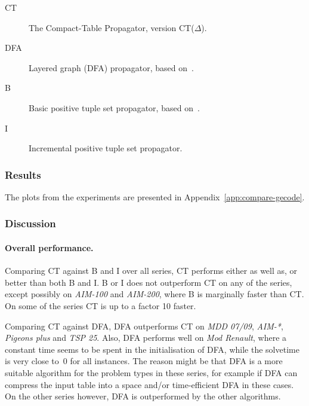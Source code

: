\documentclass[a4paper,11pt]{article}
\numberwithin{equation}{section}
\begin{document}
\begin{description}
  \item[CT] The Compact-Table Propagator, version CT($\Delta$).
  \item[DFA] Layered graph (DFA) propagator, based on~\cite{Pesant:seqs}.
  \item[B] Basic positive tuple set propagator, based on~\cite{DBLP:journals/ai/BessiereRYZ05}.
  \item[I] Incremental positive tuple set propagator.
\end{description}


\subsubsection{Results}

The plots from the experiments are presented in Appendix~\ref{app:compare-gecode}.


\subsubsection{Discussion}


\paragraph{Overall performance.}
Comparing CT against B and I over all series, CT performs either as well as,
or better than both B and I. 
B or I does not outperform CT on any of the series, except possibly
on \emph{AIM-100} and \emph{AIM-200}, where B is marginally faster than CT.
On some of the series CT is up to a factor 10 faster.

Comparing CT against DFA, DFA outperforms CT on \emph{MDD 07/09},
\emph{AIM-*}, \emph{Pigeons plus} and \emph{TSP 25}.
Also, DFA performs well on \emph{Mod Renault}, where a constant
time seems to be spent in the initialisation of DFA, while
the solvetime is very close to~$0$ for all instances.
The reason might be that DFA is a more suitable algorithm for the
problem types in these series, for example if DFA can
compress the input table into a space and/or time-efficient DFA
in these cases. On the other series however, DFA is outperformed
by the other algorithms.
\end{document}
